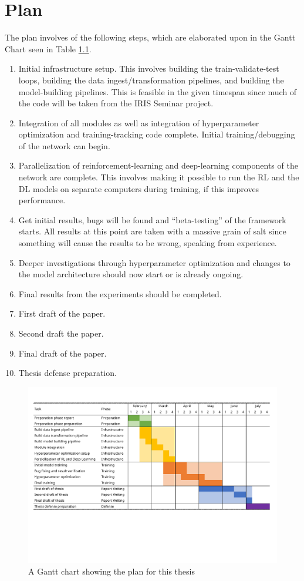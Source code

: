 \chapter{Plan}

The plan involves of the following steps, which are elaborated upon in the Gantt Chart seen in Table \ref{fig:plan-gantt-chart}.

\begin{enumerate}
	\item Initial infrastructure setup. This involves building the train-validate-test loops, building the data ingest/transformation pipelines, and building the model-building pipelines. This is feasible in the given timespan since much of the code will be taken from the IRIS Seminar project.
	\item Integration of all modules as well as integration of hyperparameter optimization and training-tracking code complete. Initial training/debugging of the network can begin.
	\item Parallelization of reinforcement-learning and deep-learning components of the network are complete. This involves making it possible to run the RL and the DL models on separate computers during training, if this improves performance.
	\item Get initial results, bugs will be found and ``beta-testing'' of the framework starts. All results at this point are taken with a massive grain of salt since something will cause the results to be wrong, speaking from experience.
	\item Deeper investigations through hyperparameter optimization and changes to the model architecture should now start or is already ongoing.
	\item Final results from the experiments should be completed.
	\item First draft of the paper.
	\item Second draft the paper.
	\item Final draft of the paper.
	\item Thesis defense preparation.
\end{enumerate}

\begin{figure}
	\centering
	\includegraphics[width=\textwidth,trim={0.5cm 5cm 0.5cm 1cm},clip]{figures/gantt_chart}
	\caption{A Gantt chart showing the plan for this thesis}\label{fig:plan-gantt-chart}
\end{figure}